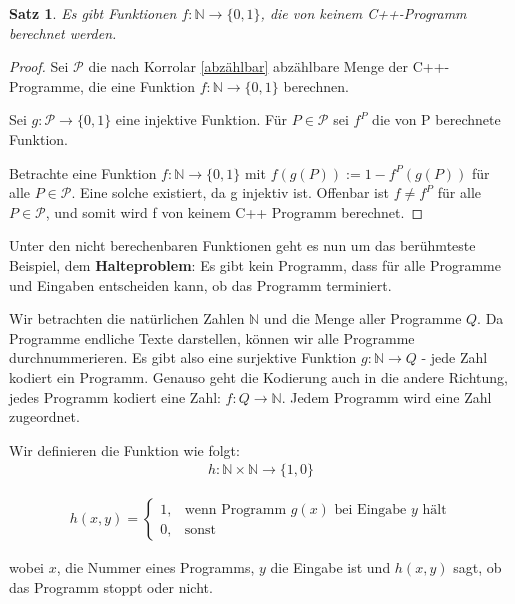 \documentclass{article}
\newcommand{\N}{\mathbb{N}}%
\newtheorem{thm}{Satz}
\begin{document}
\begin{thm}
    Es gibt Funktionen \(f: \N\to \{0,1\} \), die von keinem C++-Programm berechnet werden.

\end{thm}

\begin{proof}
    Sei $\mathcal{P}$ die nach Korrolar \ref{abzählbar} abzählbare Menge der C++-Programme, die eine Funktion \(f: \N\to \{0,1\} \) berechnen.

    Sei \(g: \mathcal{P}\to \{0,1\} \) eine injektive Funktion. 
    Für \(P \in \mathcal{P}\) sei $f^P$ die von P berechnete Funktion.

    Betrachte eine Funktion \(f: \N\to \{0,1\} \) mit \( f(g(P)):=1-f^P(g(P))\) für alle \(P \in \mathcal{P}\).
    Eine solche existiert, da g injektiv ist. Offenbar ist \(
   f \neq f^P 
    \)
    für alle 
    \(
    P \in \mathcal{P}
    \), und somit wird f von keinem C++ Programm berechnet.

    \end{proof}

Unter den nicht berechenbaren Funktionen geht es nun um das berühmteste Beispiel, dem \textbf{Halteproblem}: Es gibt kein Programm, dass für alle Programme und Eingaben entscheiden kann, ob das Programm terminiert.

\medskip

Wir betrachten die natürlichen Zahlen $\N$ und die Menge aller Programme $Q$. Da Programme endliche Texte darstellen, können wir alle Programme durchnummerieren. Es gibt also eine surjektive Funktion \(g: \N \to Q \) - jede Zahl kodiert ein Programm.
Genauso geht die Kodierung auch in die andere Richtung, jedes Programm kodiert eine Zahl: \( f: Q \to \N
\). Jedem Programm wird eine Zahl zugeordnet.

\medskip

Wir definieren die Funktion wie folgt:
\begin{align}
    h: \N \times \N \to \{1,0\}
\end{align}

\begin{align}
    h(x,y) = \begin{cases}
        1,& \text{wenn Programm $g(x)$ bei Eingabe $y$ hält}\\
        0,& \text{sonst}
    \end{cases}
\end{align}

wobei $x$, die Nummer eines Programms, $y$ die Eingabe ist und $h(x,y)$ sagt, ob das Programm stoppt oder nicht.
\end{document}
